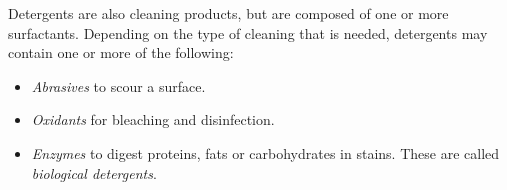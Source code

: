 \begin{enumerate}

Detergents are also cleaning products, but are composed of one or more surfactants. Depending on the type of cleaning that is needed, detergents may contain one or more of the following:

\begin{itemize}
\item{\textit{Abrasives} to scour a surface.}
\item{\textit{Oxidants} for bleaching and disinfection.}
\item{\textit{Enzymes} to digest proteins, fats or carbohydrates in stains. These are called \textit{biological detergents}.}
\end{itemize}

\end{enumerate}

\newpage

